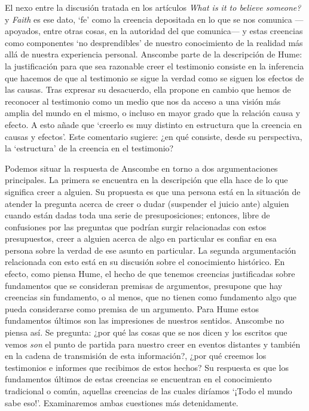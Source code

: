 El nexo entre la discusión tratada en los artículos \emph{What is it to believe someone?} y \emph{Faith} es ese dato, `fe' como la creencia depositada en lo que se nos comunica ---apoyados, entre otras cosas, en la autoridad del que comunica--- y estas creencias como componentes `no desprendibles' de nuestro conocimiento de la realidad más allá de nuestra experiencia personal. Anscombe parte de la descripción de Hume: la justificación para que sea razonable creer el testimonio consiste en la inferencia que hacemos de que al testimonio se sigue la verdad como se siguen los efectos de las causas. Tras expresar su desacuerdo, ella propone en cambio que hemos de reconocer al testimonio como un medio que nos da acceso a una visión más amplia del mundo en el mismo, o incluso en mayor grado que la relación causa y efecto. A esto añade que \enquote*{creerlo es muy distinto en estructura que la creencia en causas y efectos}. Este comentario sugiere: ¿en qué consiste, desde su perspectiva, la `estructura' de la creencia en el testimonio?

Podemos situar la respuesta de Anscombe en torno a dos argumentaciones principales. La primera se encuentra en la descripción que ella hace de lo que significa creer a alguien. Su propuesta es que una persona está en la situación de atender la pregunta acerca de creer o dudar (suspender el juicio ante) alguien cuando están dadas toda una serie de presuposiciones; entonces, libre de confusiones por las preguntas que podrían surgir relacionadas con estos presupuestos, creer a alguien acerca de algo en particular es confiar en esa persona sobre la verdad de ese asunto en particular. La segunda argumentación relacionada con esto está en su discusión sobre el conocimiento histórico. En efecto, como piensa Hume, el hecho de que tenemos creencias justificadas sobre fundamentos que se consideran premisas de argumentos, presupone que hay creencias sin fundamento, o al menos, que no tienen como fundamento algo que pueda considerarse como premisa de un argumento. Para Hume estos fundamentos últimos son las impresiones de nuestros sentidos. Anscombe no piensa así. Se pregunta: ¿por qué las cosas que se nos dicen y los escritos que vemos \emph{son} el punto de partida para nuestro creer en eventos distantes y también en la cadena de transmisión de esta información?, ¿por qué creemos los testimonios e informes que recibimos de estos hechos? Su respuesta es que los fundamentos últimos de estas creencias se encuentran en el conocimiento tradicional o común, aquellas creencias de las cuales diríamos \enquote*{¡Todo el mundo sabe eso!}. Examinaremos ambas cuestiones más detenidamente.

